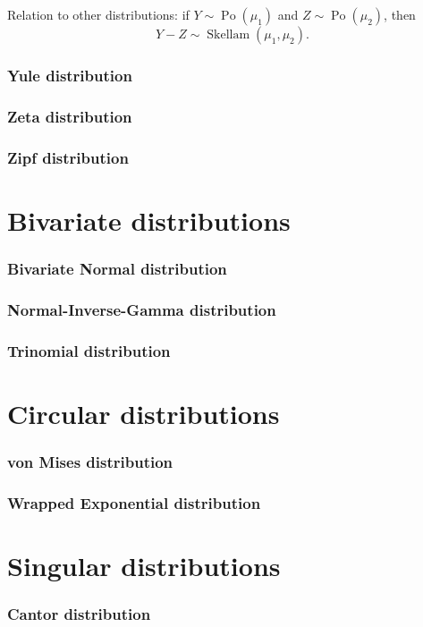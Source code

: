 \documentclass[a4paper,11pt]{article}
\theoremstyle{plain}
\theoremstyle{definition}
\begin{document}
	Relation to other distributions: if $Y \sim \operatorname{Po}(\mu_1)$ and $Z \sim \operatorname{Po}(\mu_2)$, then
	\[
	Y - Z \sim \operatorname{Skellam}(\mu_1, \mu_2).
	\]
	
	\pagebreak
	\section{Yule distribution}
	
	\pagebreak
	\section{Zeta distribution}
	
	\pagebreak
	\section{Zipf distribution}
	
	\pagebreak
	\part{Bivariate distributions}
	\section{Bivariate Normal distribution}
	\section{Normal-Inverse-Gamma distribution}
	\section{Trinomial distribution}
	
	\pagebreak
	\part{Circular distributions}
	\section{von Mises distribution}
	\section{Wrapped Exponential distribution}
	
	\pagebreak
	\part{Singular distributions}
	\section{Cantor distribution}
	
\end{document}
